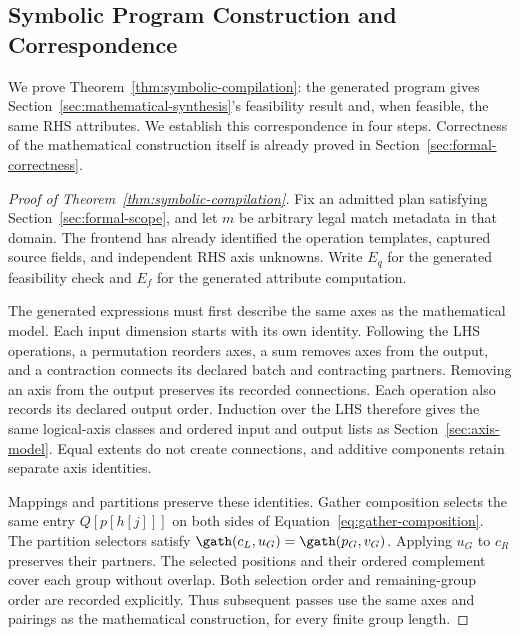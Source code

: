 \subsection{Symbolic Program Construction and Correspondence}
\label{app:symbolic-compilation-proof}
We prove Theorem~\ref{thm:symbolic-compilation}: the generated program gives
Section~\ref{sec:mathematical-synthesis}'s feasibility result and, when
feasible, the same RHS attributes. We establish this correspondence in
four steps. Correctness of the mathematical construction itself is already
proved in Section~\ref{sec:formal-correctness}.

\begin{proof}[Proof of Theorem~\ref{thm:symbolic-compilation}]
Fix an admitted plan satisfying Section~\ref{sec:formal-scope}, and let $m$
be arbitrary legal match metadata in that domain. The frontend has already
identified the operation templates, captured source fields, and independent
RHS axis unknowns. Write $E_q$ for the generated feasibility check and $E_f$
for the generated attribute computation.

The generated expressions must first describe the same axes as the
mathematical model. Each input dimension starts with its own identity.
Following the LHS operations, a permutation reorders axes, a sum removes
axes from the output, and a contraction connects its declared batch and
contracting partners. Removing an axis from the output preserves its
recorded connections. Each operation also records its declared output
order. Induction over the LHS therefore gives the same logical-axis
classes and ordered input and output lists as Section~\ref{sec:axis-model}.
Equal extents do not create connections, and additive components retain
separate axis identities.

Mappings and partitions preserve these identities. Gather composition
selects the same entry $Q[p[h[j]]]$ on both sides of
Equation~\eqref{eq:gather-composition}. The partition selectors satisfy
$\gath(c_L,u_G)=\gath(p_G,v_G)$. Applying $u_G$ to $c_R$ preserves
their partners. The selected positions and their ordered complement cover
each group without overlap. Both selection order and remaining-group order
are recorded explicitly. Thus subsequent passes use the same axes and
pairings as the mathematical construction, for every finite group length.


\end{proof}
